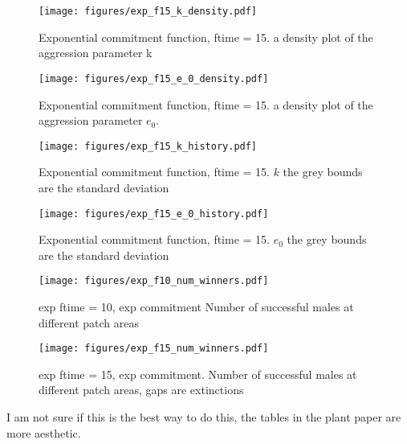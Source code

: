 \documentclass[a4paper,11pt]{article}
\begin{document}
\begin{figure}[h!]
    \centering
    \texttt{[image: figures/exp\_f15\_k\_density.pdf]}
    \caption{Exponential commitment function, ftime = 15. a density plot of the aggression parameter k}
    \label{fig:k density}

    \texttt{[image: figures/exp\_f15\_e\_0\_density.pdf]}
    \caption{Exponential commitment function, ftime = 15. a density plot of the aggression parameter $e_0$.}
    \label{fig:e_0 density}
\end{figure}

\begin{figure}[h!]
    \centering
    \texttt{[image: figures/exp\_f15\_k\_history.pdf]}
    \caption{Exponential commitment function, ftime = 15. $k$ the grey bounds are the standard deviation}

    \texttt{[image: figures/exp\_f15\_e\_0\_history.pdf]}
    \caption{Exponential commitment function, ftime = 15. $e_0$ the grey bounds are the standard deviation}
\end{figure}



\begin{figure}[h!]
    \centering
    \texttt{[image: figures/exp\_f10\_num\_winners.pdf]}
    \caption{exp ftime = 10, exp commitment Number of successful males at different patch areas}
    \label{fig:num winners expf10}

    \texttt{[image: figures/exp\_f15\_num\_winners.pdf]}
    \caption{exp ftime = 15, exp commitment. Number of successful males at different patch areas, gaps are extinctions}
    \label{fig:num winners}
\end{figure}

\clearpage


I am not sure if this is the best way to do this, the tables in the plant paper are more aesthetic.\\
\end{document}
